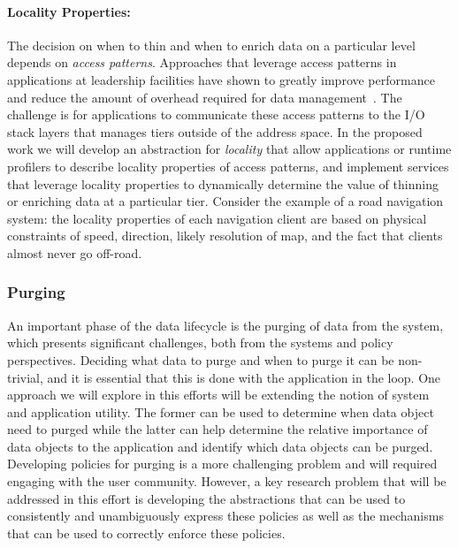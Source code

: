 \paragraph{Locality Properties:} The decision on when to thin and when to
enrich data on a particular level depends on \emph{access patterns}.
Approaches that leverage access patterns in applications at leadership facilities
 have shown to greatly improve performance and reduce the amount
of overhead required for data management~\cite{he:hpdc13}. The
challenge is for applications to communicate these access patterns
to the I/O stack layers that manages tiers outside of the address
space. In the proposed work we will develop an abstraction for
\emph{locality} that allow applications or runtime profilers to
describe locality properties of access patterns, and implement
services that leverage locality properties to dynamically determine
the value of thinning or enriching data at a particular tier.
Consider the example of a road navigation system: the locality
properties of each navigation client are based on physical constraints
of speed, direction, likely resolution of map, and the fact that
clients almost never go off-road.

\subsubsection{Purging}
\label{sec:purging-data}
An important phase of the data lifecycle is the purging of data from the system, 
which presents significant challenges, both from the systems and policy perspectives. 
Deciding what data to purge and when to purge it can be non-trivial, and it is 
essential that this is done with the application in the loop. One approach we will 
explore in this efforts will be extending the notion of system and application utility. 
The former can be used to determine when data object need to purged while the 
latter can help determine the relative importance of data objects to the 
application and identify which data objects can be purged. Developing policies 
for purging is a more challenging problem and will required engaging with the 
user community. However, a key research problem that will be addressed in
 this effort is developing the abstractions that can be used to consistently and 
 unambiguously express these policies as well as the mechanisms that can be 
 used to correctly enforce these policies. 





